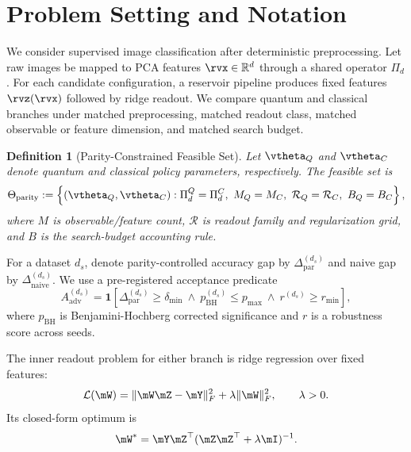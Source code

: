 \documentclass{article} %
\newtheorem{definition}[theorem]{Definition}
\begin{document}
\section{Problem Setting and Notation}
We consider supervised image classification after deterministic preprocessing. Let raw images be mapped to PCA features $\rvx \in \mathbb{R}^{d}$ through a shared operator $\Pi_d$. For each candidate configuration, a reservoir pipeline produces fixed features $\rvz(\rvx)$ followed by ridge readout. We compare quantum and classical branches under matched preprocessing, matched readout class, matched observable or feature dimension, and matched search budget.

\begin{definition}[Parity-Constrained Feasible Set]
Let $\vtheta_Q$ and $\vtheta_C$ denote quantum and classical policy parameters, respectively. The feasible set is
\begin{equation}
\Theta_{\mathrm{parity}} := \left\{(\vtheta_Q,\vtheta_C):\Pi_d^Q=\Pi_d^C,\ M_Q=M_C,\ \mathcal{R}_Q=\mathcal{R}_C,\ B_Q=B_C\right\},
\label{eq:theta_parity}
\end{equation}
where $M$ is observable/feature count, $\mathcal{R}$ is readout family and regularization grid, and $B$ is the search-budget accounting rule.
\end{definition}

For a dataset $d_s$, denote parity-controlled accuracy gap by $\Delta_{\mathrm{par}}^{(d_s)}$ and naive gap by $\Delta_{\mathrm{naive}}^{(d_s)}$. We use a pre-registered acceptance predicate
\begin{equation}
A_{\mathrm{adv}}^{(d_s)} = \mathbf{1}\!\left[\Delta_{\mathrm{par}}^{(d_s)} \ge \delta_{\min}\ \wedge\ p_{\mathrm{BH}}^{(d_s)} \le p_{\max}\ \wedge\ r^{(d_s)} \ge r_{\min}\right],
\label{eq:aadv}
\end{equation}
where $p_{\mathrm{BH}}$ is Benjamini-Hochberg corrected significance and $r$ is a robustness score across seeds.

The inner readout problem for either branch is ridge regression over fixed features:
\begin{equation}
\mathcal{L}(\mW) = \|\mW\mZ-\mY\|_F^2 + \lambda\|\mW\|_F^2,\qquad \lambda>0.
\label{eq:ridge_obj}
\end{equation}
Its closed-form optimum is
\begin{equation}
\mW^* = \mY\mZ^{\top}(\mZ\mZ^{\top}+\lambda\mI)^{-1}.
\label{eq:ridge_closed}
\end{equation}
\end{document}
